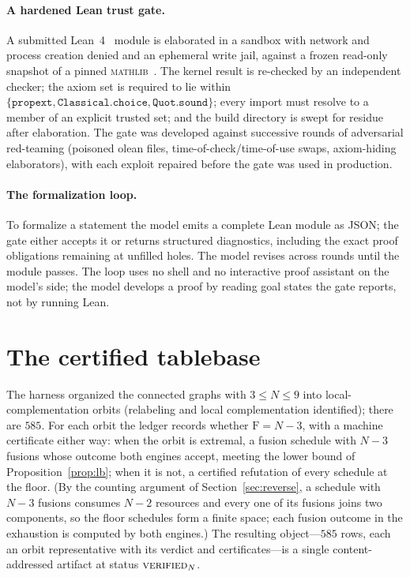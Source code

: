 \documentclass[11pt]{article}
\theoremstyle{definition}
\theoremstyle{remark}
\newcommand{\F}{\mathrm{F}}
\newcommand{\N}{N}
\newcommand{\code}[1]{\texttt{#1}}
\begin{document}
\paragraph{A hardened Lean trust gate.} A submitted Lean~4~\cite{lean4} module is elaborated in a
sandbox with network and process creation denied and an ephemeral write jail, against a frozen
read-only snapshot of a pinned \textsc{mathlib}~\cite{mathlib}. The kernel result is re-checked by
an independent checker; the axiom set is required to lie within
$\{\code{propext},\code{Classical.choice},\code{Quot.sound}\}$; every import must resolve to a
member of an explicit trusted set; and the build directory is swept for residue after elaboration.
The gate was developed against successive rounds of adversarial red-teaming (poisoned olean files,
time-of-check/time-of-use swaps, axiom-hiding elaborators), with each exploit repaired before the
gate was used in production.

\paragraph{The formalization loop.} To formalize a statement the model emits a complete Lean module
as JSON; the gate either accepts it or returns structured diagnostics, including the exact proof
obligations remaining at unfilled holes. The model revises across rounds until the module passes.
The loop uses no shell and no interactive proof assistant on the model's side; the model develops a
proof by reading goal states the gate reports, not by running Lean.

\section{The certified tablebase}\label{sec:tablebase}

The harness organized the connected graphs with $3\le\N\le 9$ into local-complementation orbits
(relabeling and local complementation identified); there are $585$. For each orbit the ledger
records whether $\F=\N-3$, with a machine certificate either way: when the orbit is extremal, a
fusion schedule with $\N-3$ fusions whose outcome both engines accept, meeting the lower bound of
Proposition~\ref{prop:lb}; when it is not, a certified refutation of every schedule at the floor.
(By the counting argument of Section~\ref{sec:reverse}, a schedule with $\N-3$ fusions consumes
$\N-2$ resources and every one of its fusions joins two components, so the floor schedules form a
finite space; each fusion outcome in the exhaustion is computed by both engines.) The resulting
object---$585$ rows, each an orbit representative with its verdict and certificates---is a single
content-addressed artifact at status $\textsc{verified}_\N$.
\end{document}
